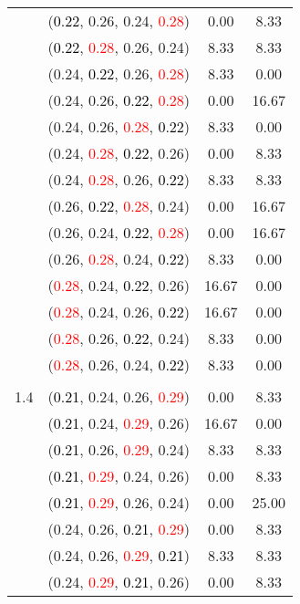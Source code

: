 \documentclass[10pt,a4paper]{report}
\begin{document}
\begin{center}
\begin{longtable}{clcc}
			&(\textcolor{black}{0.22}, 0.26, 0.24, \textcolor{red}{0.28})&0.00&8.33\\
			&(\textcolor{black}{0.22}, \textcolor{red}{0.28}, 0.26, 0.24)&8.33&8.33\\
			&(0.24, \textcolor{black}{0.22}, 0.26, \textcolor{red}{0.28})&8.33&0.00\\
			&(0.24, 0.26, \textcolor{black}{0.22}, \textcolor{red}{0.28})&0.00&16.67\\
			&(0.24, 0.26, \textcolor{red}{0.28}, \textcolor{black}{0.22})&8.33&0.00\\
			&(0.24, \textcolor{red}{0.28}, \textcolor{black}{0.22}, 0.26)&0.00&8.33\\
			&(0.24, \textcolor{red}{0.28}, 0.26, \textcolor{black}{0.22})&8.33&8.33\\
			&(0.26, \textcolor{black}{0.22}, \textcolor{red}{0.28}, 0.24)&0.00&16.67\\
			&(0.26, 0.24, \textcolor{black}{0.22}, \textcolor{red}{0.28})&0.00&16.67\\
			&(0.26, \textcolor{red}{0.28}, 0.24, \textcolor{black}{0.22})&8.33&0.00\\
			&(\textcolor{red}{0.28}, 0.24, \textcolor{black}{0.22}, 0.26)&16.67&0.00\\
			&(\textcolor{red}{0.28}, 0.24, 0.26, \textcolor{black}{0.22})&16.67&0.00\\
			&(\textcolor{red}{0.28}, 0.26, \textcolor{black}{0.22}, 0.24)&8.33&0.00\\
			&(\textcolor{red}{0.28}, 0.26, 0.24, \textcolor{black}{0.22})&8.33&0.00\\
		&&&\\
		1.4			&(\textcolor{black}{0.21}, 0.24, 0.26, \textcolor{red}{0.29})&0.00&8.33\\
			&(\textcolor{black}{0.21}, 0.24, \textcolor{red}{0.29}, 0.26)&16.67&0.00\\
			&(\textcolor{black}{0.21}, 0.26, \textcolor{red}{0.29}, 0.24)&8.33&8.33\\
			&(\textcolor{black}{0.21}, \textcolor{red}{0.29}, 0.24, 0.26)&0.00&8.33\\
			&(\textcolor{black}{0.21}, \textcolor{red}{0.29}, 0.26, 0.24)&0.00&25.00\\
			&(0.24, 0.26, \textcolor{black}{0.21}, \textcolor{red}{0.29})&0.00&8.33\\
			&(0.24, 0.26, \textcolor{red}{0.29}, \textcolor{black}{0.21})&8.33&8.33\\
			&(0.24, \textcolor{red}{0.29}, \textcolor{black}{0.21}, 0.26)&0.00&8.33\\

\end{longtable}
\end{center}
\end{document}
